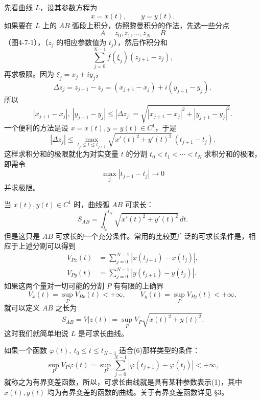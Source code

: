 先看曲线 $L$，设其参数方程为
\begin{equation}
 x=x(t),\qquad y=y(t).
 \tag{1}
\end{equation}
如果要在 $L$ 上的 $AB$ 弧段上积分，仿照黎曼积分的作法，先选一些分点
\[
 A=z_0,z_1,\ldots,z_N=B
\]
（图4-7-1），（$z_j$ 的相应参数值为 $t_j$），然后作积分和
\begin{equation}
 \sum_{j=0}^{N-1} f(\xi_j)(z_{j+1}-z_j),
 \tag{2}
\end{equation}
再求极限。因为 $\xi_j=x_j+iy_j$，
\[
 \Delta z_j=z_{j+1}-z_j=(x_{j+1}-x_j)+i(y_{j+1}-y_j),
\]
所以
\[
 |x_{j+1}-x_j|,\ |y_{j+1}-y_j|\le |\Delta z_j|
 =\sqrt{|x_{j+1}-x_j|^2+|y_{j+1}-y_j|^2}.
\]
一个便利的方法是设 $x=x(t),y=y(t)\in C^1$，于是
\begin{equation}
 |\Delta z_j|\le
 \max_{t_j\le t\le t_{j+1}}
 \sqrt{x'(t)^2+y'(t)^2}\,(t_{j+1}-t_j).
 \tag{3}
\end{equation}
这样求积分和的极限就化为对实变量 $t$ 的分割 $t_0<t_1<\cdots<t_N$ 求积分和的极限，即需令
\[
 \max_j|t_{j+1}-t_j|\to0
\]
并求极限。

当 $x(t),y(t)\in C^1$ 时，曲线弧 $AB$ 可求长：
\begin{equation}
 S_{AB}=\int_{t_0}^{t_N}\sqrt{x'(t)^2+y'(t)^2}\,dt.
 \tag{4}
\end{equation}
但是这只是 $AB$ 可求长的一个充分条件。常用的比较更广泛的可求长条件是，相应于上述分割可以得到
\begin{equation}
\begin{aligned}
 V_{Px}(t)&=\sum_{j=0}^{N-1}|x(t_{j+1})-x(t_j)|,\\
 V_{Py}(t)&=\sum_{j=0}^{N-1}|y(t_{j+1})-y(t_j)|.
\end{aligned}
 \tag{5}
\end{equation}
如果这两个量对一切可能的分割 $P$ 有有限的上确界
\begin{equation}
 V_x(t)=\sup_P V_{Px}(t)<+\infty,\qquad
 V_y(t)=\sup_P V_{Py}(t)<+\infty,
 \tag{6}
\end{equation}
就可以定义 $AB$ 之长为
\begin{equation}
 S_{AB}=V|z(t)|=\sup_P V_P\sqrt{x(t)^2+y(t)^2}.
 \tag{7}
\end{equation}
这时我们就简单地说 $L$ 是可求长曲线。

如果一个函数 $\varphi(t),\ t_0\le t\le t_{N-1}$ 适合(6)那样类型的条件：
\begin{equation}
 \sup_P V_P\varphi(t)=
 \sup_P\sum_{j=0}^{N-1}|\varphi(t_{j+1})-\varphi(t_j)|<+\infty,
 \tag{8}
\end{equation}
就称之为有界变差函数，所以，可求长曲线就是具有某种参数表示(1)，其中 $x(t),y(t)$ 均为有界变差的函数的曲线。关于有界变差函数详见 §3。

